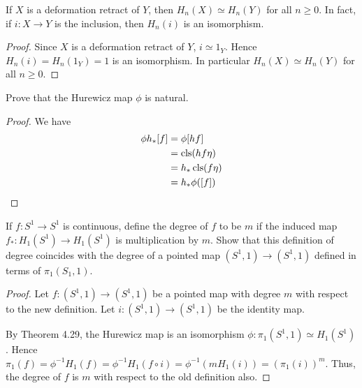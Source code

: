 \documentclass{article}
\begin{document}
 If $X$ is a deformation retract of $Y$, then $H_n(X) \simeq H_n(Y)$ for all $n \ge 0$. In fact, if
$i: X \to Y$ is the inclusion, then $H_n(i)$ is an isomorphism.
\begin{proof}
Since $X$ is a deformation retract of $Y$, $i \simeq 1_Y$. Hence $H_n(i) = H_n(1_Y) = 1$ is an isomorphism. In particular $H_n(X) \simeq H_n(Y)$ for all $n \ge 0$.
\end{proof}

 Prove that the Hurewicz map $\phi$ is natural.
\begin{proof}
We have 
\begin{align*}
\phi h_* [f] &  = \phi [h f] \\
& = \operatorname{cls} (h f \eta) \\
& = h_* \operatorname{cls} (f \eta) \\
& = h_* \phi([f])
\end{align*}
\end{proof}

 If $f:S^1 \to S^1$ is continuous, define the degree of $f$ to be $m$ if the induced map $f_*:H_1(S^1) \to H_1(S^1)$ is 
multiplication by $m$. Show that this definition of degree coincides with the degree of a pointed map $(S^1, 1) 
\to (S^1, 1)$ defined in terms of $\pi_1(S_1,1)$.
\begin{proof}
Let $f:(S^1, 1) \to (S^1, 1)$ be a pointed map with degree $m$ with respect to the new definition.
Let $i:(S^1, 1) \to (S^1, 1)$ be the identity map.

By Theorem 4.29, the Hurewicz map is an isomorphism $\phi:\pi_1(S^1,1) \simeq H_1(S^1)$.
Hence $\pi_1(f) = \phi^{-1} H_1(f) = \phi^{-1} H_1(f \circ i) = \phi^{-1}(m H_1(i))
= (\pi_1(i))^m$.
Thus, the degree of $f$ is $m$ with respect to the old definition also.
\end{proof}
\end{document}
